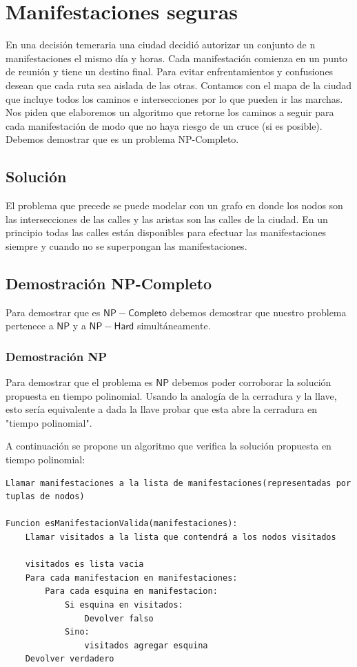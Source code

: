  \section{Manifestaciones seguras}

En una decisión temeraria una ciudad decidió autorizar un conjunto de n manifestaciones el mismo día y horas. Cada manifestación comienza en un punto de reunión y tiene un destino final. Para evitar enfrentamientos y confusiones desean que cada ruta sea aislada de las otras. Contamos con el mapa de la ciudad que incluye todos los caminos e intersecciones por lo que pueden ir las marchas. Nos piden que elaboremos un algoritmo que retorne los caminos a seguir para cada manifestación de modo que no haya riesgo de un cruce (si es posible).\newline
Debemos demostrar que es un problema NP-Completo.

\subsection{Solución}
El problema que precede se puede modelar con un grafo en donde los nodos son las intersecciones de las calles y las aristas son las calles de la ciudad. En un principio todas las calles están disponibles para efectuar las manifestaciones siempre y cuando no se superpongan las manifestaciones.

\subsection{Demostración NP-Completo}
Para demostrar que es $\mathsf{NP-Completo}$ debemos demostrar que nuestro problema pertenece a $\mathsf{NP}$ y a $\mathsf{NP-Hard}$ simultáneamente.

\subsubsection{Demostración NP}
Para demostrar que el problema es $\mathsf{NP}$ debemos poder corroborar la solución propuesta en tiempo polinomial. Usando la analogía de la cerradura y la llave, esto sería equivalente a dada la llave probar que esta abre la cerradura en "tiempo polinomial". \newline

A continuación se propone un algoritmo que verifica la solución propuesta en tiempo polinomial:

\begin{verbatim}
Llamar manifestaciones a la lista de manifestaciones(representadas por tuplas de nodos)

Funcion esManifestacionValida(manifestaciones):
    Llamar visitados a la lista que contendrá a los nodos visitados
    
    visitados es lista vacia
    Para cada manifestacion en manifestaciones:
        Para cada esquina en manifestacion:
            Si esquina en visitados:
                Devolver falso
            Sino:
                visitados agregar esquina
    Devolver verdadero
\end{verbatim}

